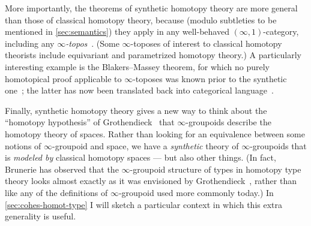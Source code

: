 \documentclass[12pt]{article}
\def\oo{\ensuremath{\infty}}
\def\io{\ensuremath{(\oo,1)}}
\numberwithin{equation}{section}
\begin{document}
More importantly, the theorems of synthetic homotopy theory are more general than those of classical homotopy theory, because (modulo subtleties to be mentioned in \cref{sec:semantics}) they apply in any well-behaved $\io$-category, %
including any \emph{$\oo$-topos}~\cite{rezk:homotopy-toposes,lurie:higher-topoi}.
(Some $\oo$-toposes of interest to classical homotopy theorists include equivariant and parametrized homotopy theory.)
A particularly interesting example is the Blakers--Massey theorem, for which no purely homotopical proof applicable to $\oo$-toposes was known prior to the synthetic one~\cite{ffll:blakers-massey}; the latter has now been translated back into categorical language~\cite{rezk:hott-blakersmassey}.

Finally, synthetic homotopy theory gives a new way to think about the ``homotopy hypothesis'' of Grothendieck~\cite{baez:homotopy-hypothesis} that $\oo$-groupoids describe the homotopy theory of spaces.
Rather than looking for an equivalence between some notions of $\oo$-groupoid and space, we have a \emph{synthetic} theory of $\oo$-groupoids that is \emph{modeled by} classical homotopy spaces --- but also other things.
(In fact, Brunerie has observed that the $\oo$-groupoid structure of types in homotopy type theory looks almost exactly as it was envisioned by Grothendieck~\cite{maltsiniotis:groth-oocat}, rather than like any of the definitions of \oo-groupoid used more commonly today.)
In \cref{sec:cohes-homot-type} I will sketch a particular context in which this extra generality is useful.
\end{document}
